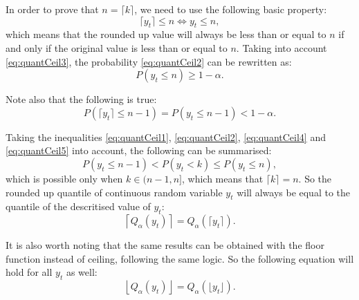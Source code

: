 \documentclass[]{elsarticle} %
\begin{document}
In order to prove that \(n = \lceil k \rceil\), we need to use the following basic property:
\begin{equation} \label{eq:quantCeil3}
    \lceil y_t \rceil \leq n \iff  y_t \leq n,
\end{equation}
which means that the rounded up value will always be less than or equal to \(n\) if and only if the original value is less than or equal to \(n\). Taking into account \eqref{eq:quantCeil3}, the probability \eqref{eq:quantCeil2} can be rewritten as:
\begin{equation} \label{eq:quantCeil4}
    P \left(y_t \leq n \right) \geq 1 - \alpha .
\end{equation}

Note also that the following is true:
\begin{equation} \label{eq:quantCeil5}
    P \left(\lceil y_t \rceil \leq n-1 \right) = P \left(y_t \leq n-1 \right) < 1 - \alpha .
\end{equation}

Taking the inequalities \eqref{eq:quantCeil1}, \eqref{eq:quantCeil2}, \eqref{eq:quantCeil4} and \eqref{eq:quantCeil5} into account, the following can be summarised:
\begin{equation} \label{eq:quantCeil6}
    P \left(y_t \leq n-1 \right) < P \left(y_t < k \right) \leq P \left(y_t \leq n \right) ,
\end{equation}
which is possible only when \(k \in (n-1, n]\), which means that \(\lceil k \rceil = n\). So the rounded up quantile of continuous random variable \(y_t\) will always be equal to the quantile of the descritised value of \(y_t\):
\begin{equation} \label{eq:ceilingAndQuantiles1}
    \left \lceil Q_\alpha(y_t) \right \rceil = Q_\alpha \left(\lceil y_t \rceil \right) .
\end{equation}

It is also worth noting that the same results can be obtained with the floor function instead of ceiling, following the same logic. So the following equation will hold for all \(y_t\) as well:
\begin{equation} \label{eq:floorAndQuantiles1}
    \left \lfloor Q_\alpha(y_t) \right \rfloor = Q_\alpha \left(\lfloor y_t \rfloor \right) .
\end{equation}

\renewcommand\refname{References}

\end{document}

